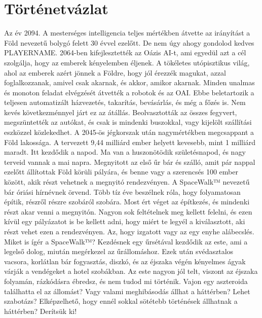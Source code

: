 \documentclass{scrarticle}
\begin{document}
\section{Történetvázlat}
Az év 2094. A mesterséges intelligencia teljes mértékben átvette az irányítást a Föld nevezetű bolygó felett 30 évvel ezelőtt. De nem úgy ahogy gondolod kedves PLAYERNAME. 2064-ben kifejlesztették az Oázis AI-t, ami egyedül azt a cél szolgálja, hogy az emberek kényelemben éljenek. A tökéletes utópisztikus világ, ahol az emberek azért jönnek a Földre, hogy jól érezzék magukat, azzal foglalkozzanak, amivel csak akarnak, és akkor, amikor akarnak. Minden unalmas és monoton feladat elvégzését átvették a robotok és az OAI. Ebbe beletartozik a teljesen automatizált házvezetés, takarítás, bevásárlás, és még a főzés is. Nem kevés következménnyel járt ez az átállás. Beolvasztották az összes fegyvert, megszüntették az autókat, és csak is mindenki buszokkal, vagy kijelölt szállítási eszközzel közlekedhet. A 2045-ös jégkorszak után nagymértékben megcsappant a Föld lakossága. A tervezett 9,44 milliárd ember helyett kevesebb, mint 1 milliárd maradt. Itt kezdődik a napod. Ma van a huszonötödik születésnapod, és nagy terveid vannak a mai napra. Megnyitott az első űr bár és szálló, amit pár nappal ezelőtt állítottak Föld körüli pályára, és benne vagy a szerencsés 100 ember között, akik részt vehetnek a megnyitó rendezvényen. A SpaceWalk™ nevezetű bár óriási hírnévnek örvend. Több tíz éve beszélnek róla, hogy folyamatosan építik, részről részre szobáról szobára. Most ért véget az építkezés, és mindenki részt akar venni a megnyitón. Nagyon sok feltételnek meg kellett felelni, és ezen kívül egy pályázatot is be kellett adni, hogy miért te legyél a kiválasztott, aki részt vehet ezen a rendezvényen. Az, hogy izgatott vagy az egy enyhe alábecslés. Miket is ígér a SpaceWalk™? Kezdésnek egy űrsétával kezdődik az este, ami a legelső dolog, miután megérkezel az űrállomáshoz. Ezek után svédasztalos vacsora, korlátlan bár fogyasztás, diszkó, és az éjszaka végén kényelmes ágyak várják a vendégeket a hotel szobákban.  Az este nagyon jól telt, viszont az éjszaka folyamán, rázkódásra ébredsz, és nem tudod mi történik. Vajon egy aszteroida találhatta el az állomást? Vagy valami meghibásodás állhat a háttérben? Lehet szabotázs? Elképzelhető, hogy ennél sokkal sötétebb történések állhatnak a háttérben? Derítsük ki!
\end{document}
